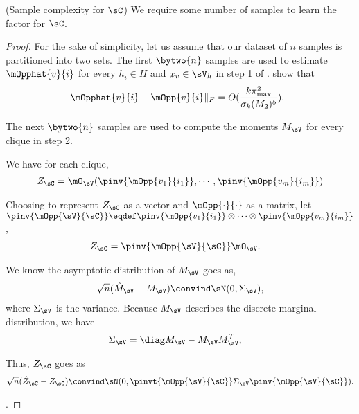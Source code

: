 \begin{lemma}(Sample complexity for $\sC$)
  \label{lem:mom-complexity}  
We require some number of samples to learn the factor for $\sC$.
\end{lemma}
\begin{proof}

For the sake of simplicity, let us assume that our dataset of $n$
  samples is partitioned into two sets.
  The first $\bytwo{n}$ samples are used to estimate $\mOpphat{v}{i}$ for
  every $h_i \in H$ and $x_v \in \sV_{h}$ in step 1 of .
\citet{anandkumar13tensor} show that 
\begin{align*}
  \|\mOpphat{v}{i} - \mOpp{v}{i}\|_F &= O( \frac{k \pi_{\max}^2}{\sigma_k(M_2)^5} ). 
\end{align*}

The next $\bytwo{n}$ samples are used to compute the moments $M_\sV$ for
  every clique in step 2.

We have for each clique,
\begin{align*}
  Z_{\sC} &= \mO_\sV(\pinv{\mOpp{v_1}{i_1}},\cdots,\pinv{\mOpp{v_m}{i_m}}) \\
\end{align*}

Choosing to represent $Z_\sC$ as a vector and $\mOpp{\cdot}{\cdot}$ as a matrix,
let $\pinv{\mOpp{\sV}{\sC}} \eqdef \pinv{\mOpp{v_1}{i_1}} \otimes \cdots \otimes \pinv{\mOpp{v_m}{i_m}}$,
\begin{align*}
  Z_{\sC} &= \pinv{\mOpp{\sV}{\sC}} \mO_\sV.
\end{align*}

We know the asymptotic distribution of $M_\sV$ goes as,
\begin{align*}
  \sqrt{n}(\hat M_\sV - M_\sV) \convind \sN(0, \Sigma_\sV),
\end{align*}
where $\Sigma_\sV$ is the variance. Because $M_\sV$ describes the discrete marginal distribution, we have 
\begin{align*}
  \Sigma_\sV &= \diag  M_\sV  - M_\sV M_\sV^T,
\end{align*}

Thus, $Z_\sC$ goes as
\begin{align*}
  \sqrt{n}(\hat Z_\sC - Z_\sC) \convind \sN(0, \pinvt{\mOpp{\sV}{\sC}} \Sigma_\sV \pinv{\mOpp{\sV}{\sC}}).
\end{align*}

.

\end{proof}

